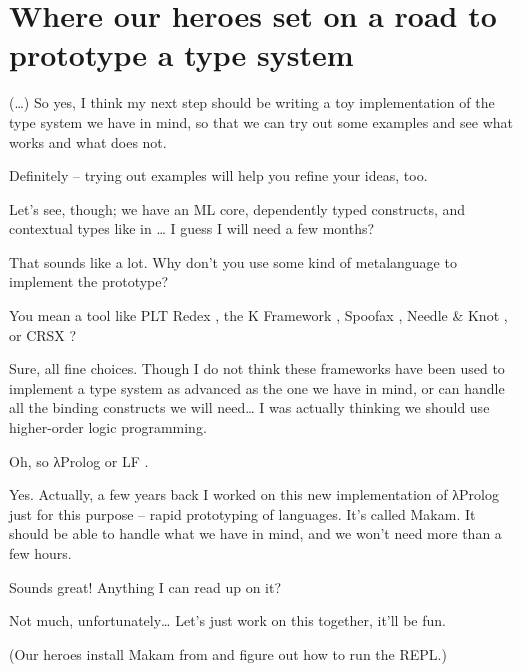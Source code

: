 \section{Where our heroes set on a road to prototype a type
system}\label{where-our-heroes-set-on-a-road-to-prototype-a-type-system}

 (\ldots{}) So yes, I think my next step should be
writing a toy implementation of the type system we have in mind, so that
we can try out some examples and see what works and what does not.

 Definitely -- trying out examples will help you
refine your ideas, too.

\heroSTUDENT{} Let's see, though; we have an ML core, dependently typed
constructs, and contextual types like in
\citet{nanevski2008contextual}\ldots{} I guess I will need a few months?

\heroADVISOR{} That sounds like a lot. Why don't you use some kind of
metalanguage to implement the prototype?

\heroSTUDENT{} You mean a tool like PLT Redex \citep{felleisen2009semantics},
the K Framework \citep{rosu2010overview,ellison2009rewriting}, Spoofax
\citep{kats2010spoofax}, Needle \& Knot \citep{keuchel2016needle}, or
CRSX \citep{rose2011crsx}?

\heroADVISOR{} Sure, all fine choices. Though I do not think these frameworks
have been used to implement a type system as advanced as the one we have
in mind, or can handle all the binding constructs we will need\ldots{} I
was actually thinking we should use higher-order logic programming.

\heroSTUDENT{} Oh, so \foreignlanguage{greek}{λ}Prolog \citep{miller1988overview} or LF
\citep{pfenning1999system}.

\heroADVISOR{} Yes. Actually, a few years back I worked on this new
implementation of \foreignlanguage{greek}{λ}Prolog just for this purpose -- rapid prototyping of
languages. It's called Makam. It should be able to handle what we have
in mind, and we won't need more than a few hours.

\heroSTUDENT{} Sounds great! Anything I can read up on it?

\heroADVISOR{} Not much, unfortunately\ldots{} Let's just work on this
together, it'll be fun.

\begin{scenecomment}
(Our heroes install Makam from
\fi\xspace
and figure out how to run the REPL.)
\end{scenecomment}

